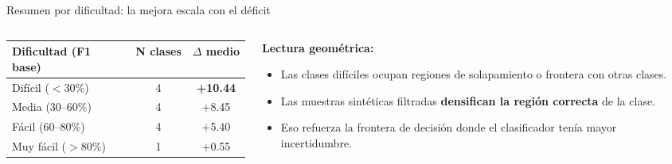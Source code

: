 \begin{frame}{Resumen por dificultad: la mejora escala con el déficit}
\begin{columns}[T]

\begin{column}{0.50\textwidth}
\centering
\scriptsize
\renewcommand{\arraystretch}{1.05}
\begin{tabular}{@{}lcc@{}}
\toprule
\textbf{Dificultad (F1 base)} & \textbf{N clases} & \textbf{$\Delta$ medio} \\
\midrule
\rowcolor{uaiorange!18} Difícil ($<$30\%)        & 4 & \alert{\textbf{+10.44}} \\
\rowcolor{uaiorange!8}  Media (30--60\%)         & 4 & +8.45 \\
                        Fácil (60--80\%)         & 4 & +5.40 \\
\rowcolor{methodSMOTE!10} Muy fácil ($>$80\%)   & 1 & +0.55 \\
\bottomrule
\end{tabular}

\vspace{0.6em}
\end{column}

\begin{column}{0.50\textwidth}
\small
\textbf{Lectura geométrica:}
\begin{itemize}\setlength\itemsep{1pt}\scriptsize
  \item Las clases difíciles \alert{ocupan regiones de solapamiento} o frontera con otras clases.
  \item Las muestras sintéticas filtradas \textbf{densifican la región correcta} de la clase.
  \item Eso refuerza la frontera de decisión donde el clasificador tenía mayor incertidumbre.
\end{itemize}


\end{column}
\end{columns}
\end{frame}
